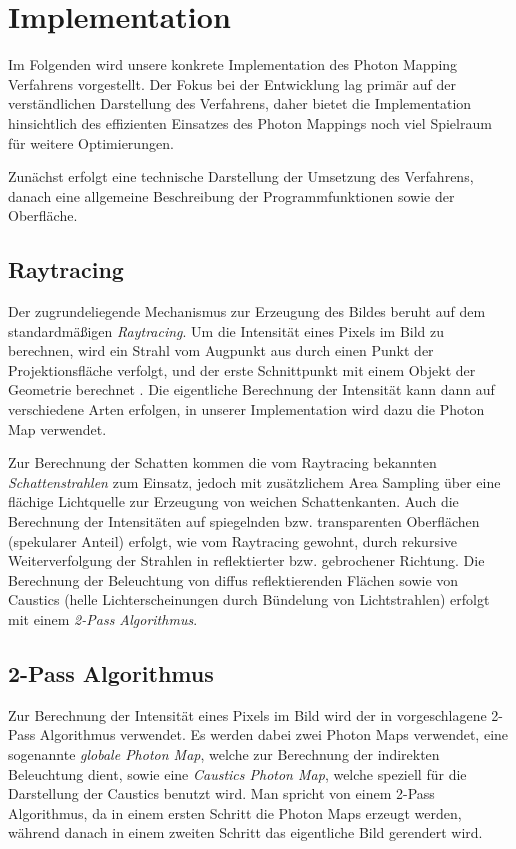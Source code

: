 \documentclass[a4paper,twocolumn,abstracton]{scrartcl}
\begin{document}
\section{Implementation}
Im Folgenden wird unsere konkrete Implementation des Photon Mapping Verfahrens vorgestellt. Der Fokus bei der Entwicklung lag primär auf der verständlichen Darstellung des Verfahrens, daher bietet die Implementation hinsichtlich des effizienten Einsatzes des Photon Mappings noch viel Spielraum für weitere Optimierungen. 

Zunächst erfolgt eine technische Darstellung der Umsetzung des Verfahrens, danach eine allgemeine Beschreibung der Programmfunktionen sowie der Oberfläche.

\subsection{Raytracing}
Der zugrundeliegende Mechanismus zur Erzeugung des Bildes beruht auf dem standardmäßigen \emph{Raytracing}. Um die Intensität eines Pixels im Bild zu berechnen, wird ein Strahl vom Augpunkt aus durch einen Punkt der Projektionsfläche verfolgt, und der erste Schnittpunkt mit einem Objekt der Geometrie berechnet \citep{Purgathofer2002, Shirley2005}. Die eigentliche Berechnung der Intensität kann dann auf verschiedene Arten erfolgen, in unserer Implementation wird dazu die Photon Map verwendet.

Zur Berechnung der Schatten kommen die vom Raytracing bekannten \emph{Schattenstrahlen} zum Einsatz, jedoch mit zusätzlichem Area Sampling über eine flächige Lichtquelle zur Erzeugung von weichen Schattenkanten. Auch die Berechnung der Intensitäten auf spiegelnden bzw. transparenten Oberflächen (spekularer Anteil) erfolgt, wie vom Raytracing gewohnt, durch rekursive Weiterverfolgung der Strahlen in reflektierter bzw. gebrochener Richtung. Die Berechnung der Beleuchtung von diffus reflektierenden Flächen sowie von Caustics (helle Lichterscheinungen durch Bündelung von Lichtstrahlen) erfolgt mit einem \emph{2-Pass Algorithmus}.

\subsection{2-Pass Algorithmus}
Zur Berechnung der Intensität eines Pixels im Bild wird der in \citep{Jensen2001} vorgeschlagene 2-Pass Algorithmus verwendet. Es werden dabei zwei Photon Maps verwendet, eine sogenannte \emph{globale Photon Map}, welche zur Berechnung der indirekten Beleuchtung dient, sowie eine \emph{Caustics Photon Map}, welche speziell für die Darstellung der Caustics benutzt wird. Man spricht von einem 2-Pass Algorithmus, da in einem ersten Schritt die Photon Maps erzeugt werden, während danach in einem zweiten Schritt das eigentliche Bild gerendert wird.
\end{document}
